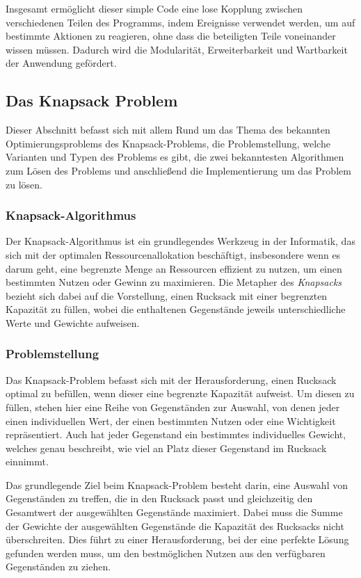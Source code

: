Insgesamt ermöglicht dieser simple Code eine lose Kopplung zwischen verschiedenen Teilen des Programms, indem Ereignisse verwendet
werden, um auf bestimmte Aktionen zu reagieren, ohne dass die beteiligten Teile voneinander wissen müssen. Dadurch wird die
Modularität, Erweiterbarkeit und Wartbarkeit der Anwendung gefördert.

\subsection{Das Knapsack Problem} 
Dieser Abschnitt befasst sich mit allem Rund um das Thema des bekannten Optimierungsproblems des Knapsack-Problems, die
Problemstellung, welche Varianten und Typen des Problems es gibt, die zwei bekanntesten Algorithmen zum Lösen des Problems
und anschließend die Implementierung um das Problem zu lösen.

\subsubsection{Knapsack-Algorithmus}
Der Knapsack-Algorithmus ist ein grundlegendes Werkzeug in der Informatik, das sich mit der optimalen Ressourcenallokation
beschäftigt, insbesondere wenn es darum geht, eine begrenzte Menge an Ressourcen effizient zu nutzen, um einen bestimmten
Nutzen oder Gewinn zu maximieren. Die Metapher des \textit{Knapsacks} bezieht sich dabei auf die Vorstellung, einen Rucksack
mit einer begrenzten Kapazität zu füllen, wobei die enthaltenen Gegenstände jeweils unterschiedliche Werte und Gewichte aufweisen.

\subsubsection{Problemstellung}
Das Knapsack-Problem befasst sich mit der Herausforderung, einen Rucksack optimal zu befüllen, wenn dieser eine begrenzte
Kapazität aufweist. Um diesen zu füllen, stehen hier eine Reihe von Gegenständen zur Auswahl, von denen jeder einen
individuellen Wert, der einen bestimmten Nutzen oder eine Wichtigkeit repräsentiert. Auch hat jeder Gegenstand ein
bestimmtes individuelles Gewicht, welches genau beschreibt, wie viel an Platz dieser Gegenstand im Rucksack einnimmt.

Das grundlegende Ziel beim Knapsack-Problem besteht darin, eine Auswahl von Gegenständen zu treffen, die in den Rucksack
passt und gleichzeitig den Gesamtwert der ausgewählten Gegenstände maximiert. Dabei muss die Summe der Gewichte der
ausgewählten Gegenstände die Kapazität des Rucksacks nicht überschreiten. Dies führt zu einer Herausforderung, bei der
eine perfekte Lösung gefunden werden muss, um den bestmöglichen Nutzen aus den verfügbaren Gegenständen zu ziehen.

